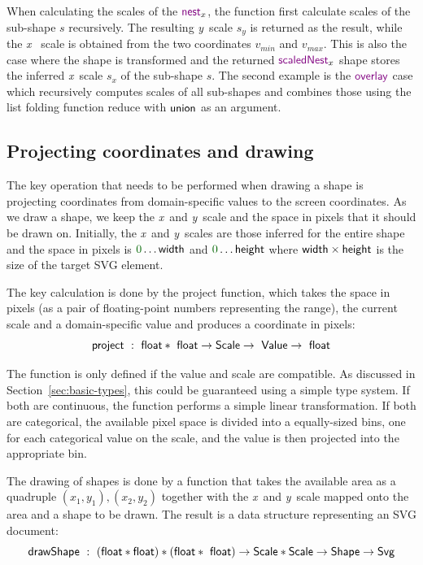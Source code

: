 \documentclass{jfp}
\newcommand{\X}{\emph{x}\ }
\newcommand{\Y}{\emph{y}\ }
\newcommand{\num}[1]{\textcolor{numclr}{#1}}
\newcommand{\ident}[1]{\textnormal{\textcolor{idclr}{\sffamily #1}}}
\newcommand{\kvd}[1]{\textnormal{\textcolor{kvdclr}{\sffamily #1}}}
\begin{document}
\vspace{-0.5em}
\noindent
When calculating the scales of the $\kvd{nest}_x$, the function first calculate scales of the
sub-shape $s$ recursively. The resulting \Y scale $s_y$ is returned as the result, while the \X
scale is obtained from the two coordinates $v_{min}$ and $v_{max}$. This is also the case where
the shape is transformed and the returned $\kvd{scaledNest}_x$ shape stores the inferred \X scale
$s_x$ of the sub-shape $s$. The second example is the $\kvd{overlay}$ case which recursively
computes scales of all sub-shapes and combines those using the list folding function
\ident{reduce} with $\ident{union}$ as an argument.

\subsection{Projecting coordinates and drawing}
The key operation that needs to be performed when drawing a shape is projecting coordinates from
domain-specific values to the screen coordinates. As we draw a shape, we keep the \X and \Y scale
and the space in pixels that it should be drawn on. Initially, the \X and \Y scales are those
inferred for the entire shape and the space in pixels is $\num{0}\ldots\ident{width}$ and
$\num{0}\ldots\ident{height}$ where $\ident{width}\times\ident{height}$ is the size of the target
SVG element.

The key calculation is done by the \ident{project} function, which takes the space in pixels (as a
pair of floating-point numbers representing the range), the current scale and a domain-specific value
and produces a coordinate in pixels:
%
\begin{equation*}
\ident{project}~:~\ident{float}*\ident{float}\rightarrow \ident{Scale}\rightarrow\ident{Value} \rightarrow \ident{float}
\end{equation*}

\vspace{-1.25em}
\noindent
The function is only defined if the value and scale are compatible. As discussed in Section~\ref{sec:basic-types},
this could be guaranteed using a simple type system. If both are continuous, the
function performs a simple linear transformation. If both are categorical, the available pixel
space is divided into a equally-sized bins, one for each categorical value on the scale, and the
value is then projected into the appropriate bin.

The drawing of shapes is done by a function that takes the available area as a quadruple $(x_1, y_1), (x_2, y_2)$
together with the \X and \Y scale mapped onto the area and a shape to be drawn. The result is
a data structure representing an SVG document:
%
\begin{equation*}
\ident{drawShape}~:~(\ident{float}*\ident{float})*(\ident{float}*\ident{float}) \rightarrow \ident{Scale}*\ident{Scale}\rightarrow\ident{Shape}\rightarrow\ident{Svg}
\end{equation*}
\end{document}
